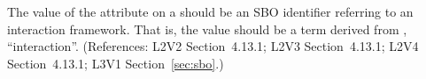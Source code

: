 The value of the  attribute on a \Reaction should
be an SBO identifier referring to an interaction framework.  That
is, the value should be a term derived from \sbointeractionID,
``interaction''.  (References: L2V2 Section~4.13.1; L2V3
Section~4.13.1; L2V4 Section~4.13.1; L3V1 Section~\ref{sec:sbo}.)
